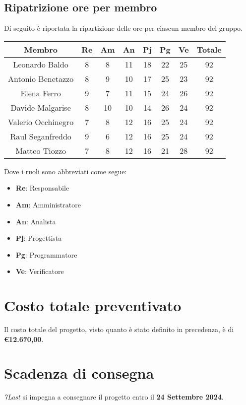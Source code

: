 \documentclass[italian,12pt]{article} %
\begin{document}
\newpage
\subsection{Ripatrizione ore per membro}
Di seguito è riportata la ripartizione delle ore per ciascun membro del gruppo.

\begin{table}[!h]
	\begin{center}
		\begin{tabular}{ |c|c|c|c|c|c|c|c| }
			\hline
			\textbf{Membro}    & \textbf{Re} & \textbf{Am} & \textbf{An} & \textbf{Pj} & \textbf{Pg} & \textbf{Ve} & \textbf{Totale} \\
			\hline
			Leonardo Baldo     & 8           & 8           & 11          & 18          & 22          & 25          & 92              \\
			Antonio Benetazzo  & 8           & 9           & 10          & 17          & 25          & 23          & 92              \\
			Elena Ferro        & 9           & 7           & 11          & 15          & 24          & 26          & 92              \\
			Davide Malgarise   & 8           & 10          & 10          & 14          & 26          & 24          & 92              \\
			Valerio Occhinegro & 7           & 8           & 12          & 16          & 25          & 24          & 92              \\
			Raul Seganfreddo   & 9           & 6           & 12          & 16          & 25          & 24          & 92              \\
			Matteo Tiozzo      & 7           & 8           & 12          & 16          & 21          & 28          & 92              \\
			\hline
		\end{tabular}
	\end{center}
\end{table}

Dove i ruoli sono abbreviati come segue:
\begin{itemize}
	\item \textbf{Re}: Responsabile
	\item \textbf{Am}: Amministratore
	\item \textbf{An}: Analista
	\item \textbf{Pj}: Progettista
	\item \textbf{Pg}: Programmatore
	\item \textbf{Ve}: Verificatore
\end{itemize}

\section{Costo totale preventivato}
Il costo totale del progetto, visto quanto è stato definito in precedenza, è di \textbf{€12.670,00}.

\section{Scadenza di consegna}
\textit{7Last} si impegna a consegnare il progetto entro il \textbf{24 Settembre 2024}.
\end{document}
